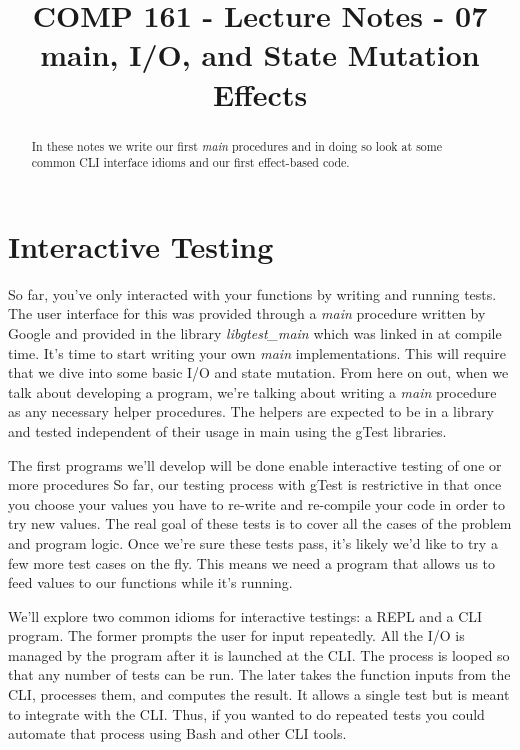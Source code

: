 \documentclass[]{tufte-handout}
\title{COMP 161 - Lecture Notes - 07 \newline main, I/O, and State Mutation Effects}
\begin{document}
\maketitle

\begin{abstract}
In these notes we write our first \textit{main} procedures and in doing so look at some common CLI interface idioms and our first effect-based code.

\end{abstract}

\section{Interactive Testing}

So far, you've only interacted with your functions by writing and running tests. The user interface for this was provided through a \textit{main} procedure written by Google and provided in the library \textit{libgtest\_main} which was linked in at compile time. It's time to start writing your own \textit{main} implementations. This will require that we dive into some basic I/O and state mutation. From here on out, when we talk about developing a program, we're talking about writing a \textit{main} procedure as any necessary helper procedures. The helpers are expected to be in a library and tested independent of their usage in main using the gTest libraries.

The first programs we'll develop will be done enable interactive testing of one or more procedures So far, our testing process with gTest is restrictive in that once you choose your values you have to re-write and re-compile your code in order to try new values.  The real goal of these tests is to cover all the cases of the problem and program logic.  Once we're sure these tests pass, it's likely we'd like to try a few more test cases on the fly. This means we need a program that allows us to feed values to our functions while it's running.

We'll explore two common idioms for interactive testings: a REPL and a CLI program. The former prompts the user for input repeatedly. All the I/O is managed by the program after it is launched at the CLI. The process is looped so that any number of tests can be run. The later takes the function inputs from the CLI, processes them, and computes the result. It allows a single test but is meant to integrate with the CLI. Thus, if you wanted to do repeated tests you could automate that process using Bash and other CLI tools.
\end{document}
